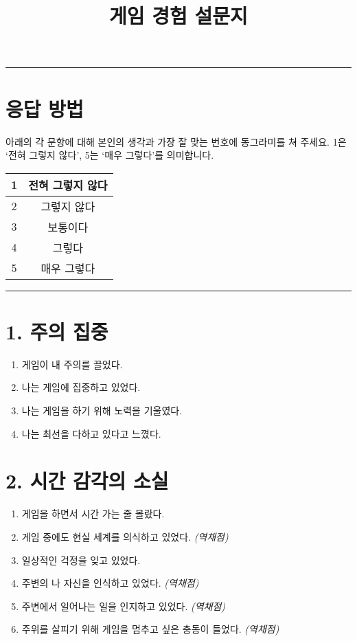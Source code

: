 \documentclass[12pt]{article}
\title{\textbf{게임 경험 설문지}}
\author{}
\date{}
\begin{document}
\maketitle
\hrule
\vspace{0.5cm}

\section*{응답 방법}
아래의 각 문항에 대해 본인의 생각과 가장 잘 맞는 번호에 동그라미를 쳐 주세요.  
1은 ‘전혀 그렇지 않다’, 5는 ‘매우 그렇다’를 의미합니다.

\vspace{0.5cm}

\begin{center}
\begin{tabular}{|c|c|}
\hline
1 & 전혀 그렇지 않다 \\
\hline
2 & 그렇지 않다 \\
\hline
3 & 보통이다 \\
\hline
4 & 그렇다 \\
\hline
5 & 매우 그렇다 \\
\hline
\end{tabular}
\end{center}

\vspace{0.5cm}
\hrule
\vspace{0.5cm}

\section*{1. 주의 집중}

\begin{enumerate}[label=\arabic*.]
  \item 게임이 내 주의를 끌었다.
  \item 나는 게임에 집중하고 있었다.
  \item 나는 게임을 하기 위해 노력을 기울였다.
  \item 나는 최선을 다하고 있다고 느꼈다.
\end{enumerate}

\section*{2. 시간 감각의 소실}

\begin{enumerate}[resume]
  \item 게임을 하면서 시간 가는 줄 몰랐다.
  \item 게임 중에도 현실 세계를 의식하고 있었다. \textit{(역채점)}
  \item 일상적인 걱정을 잊고 있었다.
  \item 주변의 나 자신을 인식하고 있었다. \textit{(역채점)}
  \item 주변에서 일어나는 일을 인지하고 있었다. \textit{(역채점)}
  \item 주위를 살피기 위해 게임을 멈추고 싶은 충동이 들었다. \textit{(역채점)}
\end{enumerate}
\end{document}
